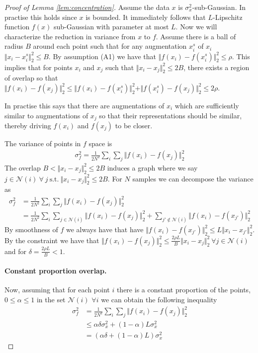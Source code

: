 \documentclass{article}
\newcommand{\feat}{f}
\newcommand{\nrm}[1]{\Vert {#1} \Vert_2^2}
\begin{document}
\begin{proof}[Proof of Lemma \ref{lem:concentration}]
Assume the data $x$ is $\sigma^2_x$-sub-Gaussian. In practise this holds since $x$ is bounded. It immediately follows that $L$-Lipschitz function $\feat(x)$ sub-Gaussian with parameter at most $L$. Now we will characterize the reduction in variance from $x$ to $\feat$. Assume there is a ball of radius $B$ around each point such that for any augmentation $x_i^{s}$ of $x_i$ $\nrm{x_i - x_i^{s}} \leq B$. By assumption (A1) we have that $\nrm{\feat(x_i) - \feat(x_i^{s})}\leq \rho$. This implies that for points $x_i$ and $x_j$ such that $\nrm{x_i - x_j} \leq 2B$, there exists a region of overlap so that $\nrm{\feat(x_i) - \feat(x_j)}\leq \nrm{\feat(x_i) - \feat(x^s_i)} + \nrm{\feat(x^s_i) - \feat(x_j)} \leq 2\rho$. 

In practise this says that there are augmentations of $x_i$ which are sufficiently similar to augmentations of $x_j$ so that their representations should be similar, thereby driving $\feat(x_i)$ and $\feat(x_j)$ to be closer.

The variance of points in $\feat$ space is
\begin{align*}
\sigma^2_{\feat} = \frac{1}{2N^2} \sum_{i}\sum_{j} \nrm{\feat(x_i) - \feat(x_j)} 
\end{align*}
The overlap $B < \nrm{x_i - x_j} \leq 2B$ induces a graph where we say $j \in \mathcal{N}(i) ~ \forall ~ j ~ \text{s.t.} ~ \nrm{x_i - x_j} \leq 2B$.
For $N$ samples we can decompose the variance as
\begin{align*}
    \sigma^2_{\feat} & = \frac{1}{2N^2} \sum_{i}\sum_{j} \nrm{\feat(x_i) - \feat(x_j)} 
    \\
    & = \frac{1}{2N^2} \sum_{i} \sum_{j\in\mathcal{N}(i)} \nrm{\feat(x_i) - \feat(x_j)} + \sum_{j'\notin\mathcal{N}(i)} \nrm{\feat(x_i) - \feat(x_{j'})} 
\end{align*}
 By smoothness of $\feat$ we always have that have $\nrm{\feat(x_i) - \feat(x_{j'})}\leq L \nrm{x_i - x_{j'}}$. By the constraint we have that $\nrm{\feat(x_i) - \feat(x_j)}\leq \frac{2\rho L}{B} \nrm{x_i - x_j} ~ \forall j \in \mathcal{N}(i) $ and for $ \delta =  \frac{2\rho L}{B} < 1$.

\paragraph{Constant proportion overlap.}
Now, assuming that for each point $i$ there is a constant proportion of the points, $0 \leq \alpha \leq 1$ in the set $\mathcal{N}(i)$ $\forall i$ we can obtain the following inequality
\begin{align}
    \sigma^2_{\feat} & = \frac{1}{2N^2} \sum_{i}\sum_{j} \nrm{\feat(x_i) - \feat(x_j)} \nonumber
    \\
    & \leq  \alpha \delta \sigma^2_x + (1-\alpha)L \sigma^2_x \nonumber
    \\
    & = (\alpha \delta + (1-\alpha)L) \sigma^2_x
    \label{eq:const_prop}
\end{align}


\end{proof}
\end{document}
